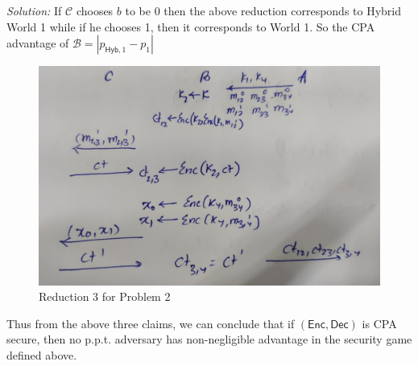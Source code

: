\documentclass[a4paper, 11pt]{article}
\newenvironment{solution}
    {\textit{Solution:}}
    {\clearpage}
\newcommand{\hyb}{\mathsf{Hyb}}
\newcommand{\enc}{\mathsf{Enc}}
\newcommand{\dec}{\mathsf{Dec}}
\newcommand{\calB}{\mathcal{B}}
\newcommand{\calC}{\mathcal{C}}
\begin{document}
\begin{solution}
    If $\calC$ chooses $b$ to be 0 then the above reduction corresponds to Hybrid World 1  while if he chooses 1, then it corresponds to World 1. So the CPA advantage of $\calB=|p_{\hyb,1}-p_{1}|$

    \begin{figure}[!ht]
        \centering
        \includegraphics[scale=0.25]{images/Reduction23.jpg}
        \caption{Reduction 3 for Problem 2}
        \label{fig:p23}
    \end{figure}

    Thus from the above three claims, we can conclude that if $(\enc,\dec)$ is CPA secure, then no p.p.t. adversary has non-negligible advantage in the security game defined above.
\end{solution}
\end{document}
